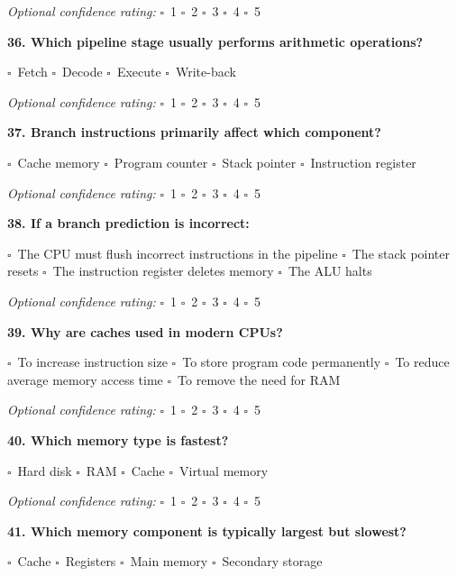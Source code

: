 \documentclass[12pt,a4paper]{article}
\newcommand{\boxmark}{\(\square\)}
\newcommand{\confidenceoptional}{%
    \textit{Optional confidence rating:} \boxmark\ 1 \hspace{1em} \boxmark\ 2 \hspace{1em} \boxmark\ 3 \hspace{1em} \boxmark\ 4 \hspace{1em} \boxmark\ 5
}
\begin{document}
\confidenceoptional

\textbf{36. Which pipeline stage usually performs arithmetic operations?}

\boxmark\ Fetch \hspace{2em}
\boxmark\ Decode \hspace{2em}
\boxmark\ Execute \hspace{2em}
\boxmark\ Write-back

\confidenceoptional

\textbf{37. Branch instructions primarily affect which component?}

\boxmark\ Cache memory \hspace{1em}
\boxmark\ Program counter \hspace{1em}
\boxmark\ Stack pointer \hspace{1em}
\boxmark\ Instruction register

\confidenceoptional

\textbf{38. If a branch prediction is incorrect:}

\boxmark\ The CPU must flush incorrect instructions in the pipeline \hspace{1em}
\boxmark\ The stack pointer resets \hspace{1em}
\boxmark\ The instruction register deletes memory \hspace{1em}
\boxmark\ The ALU halts

\confidenceoptional

\textbf{39. Why are caches used in modern CPUs?}

\boxmark\ To increase instruction size \hspace{1em}
\boxmark\ To store program code permanently \hspace{1em}
\boxmark\ To reduce average memory access time \hspace{1em}
\boxmark\ To remove the need for RAM

\confidenceoptional

\textbf{40. Which memory type is fastest?}

\boxmark\ Hard disk \hspace{2em}
\boxmark\ RAM \hspace{2em}
\boxmark\ Cache \hspace{2em}
\boxmark\ Virtual memory

\confidenceoptional

\textbf{41. Which memory component is typically largest but slowest?}

\boxmark\ Cache \hspace{2em}
\boxmark\ Registers \hspace{2em}
\boxmark\ Main memory \hspace{2em}
\boxmark\ Secondary storage
\end{document}
